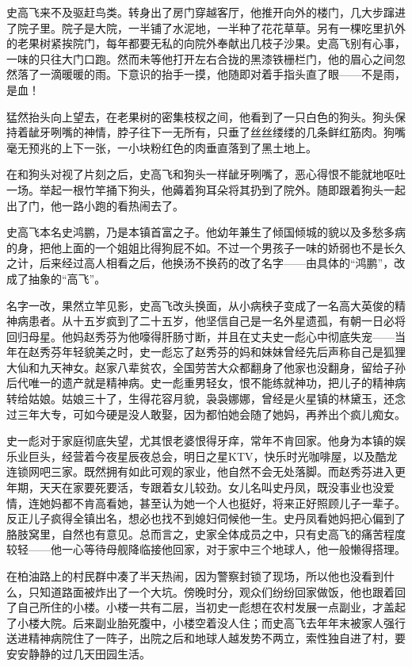 史高飞来不及驱赶鸟类。转身出了房门穿越客厅，他推开向外的楼门，几大步蹿进了院子里。院子是大院，一半铺了水泥地，一半种了花花草草。另有一棵吃里扒外的老果树紧挨院门，每年都要无私的向院外奉献出几枝子沙果。史高飞别有心事，一味的只往大门口跑。然而未等他打开左右合拢的黑漆铁栅栏门，他的眉心之间忽然落了一滴暖暖的雨。下意识的抬手一摸，他随即对着手指头直了眼——不是雨，是血！

猛然抬头向上望去，在老果树的密集枝杈之间，他看到了一只白色的狗头。狗头保持着龇牙咧嘴的神情，脖子往下一无所有，只垂了丝丝缕缕的几条鲜红筋肉。狗嘴毫无预兆的上下一张，一小块粉红色的肉垂直落到了黑土地上。

在和狗头对视了片刻之后，史高飞和狗头一样龇牙咧嘴了，恶心得恨不能就地呕吐一场。举起一根竹竿捅下狗头，他薅着狗耳朵将其扔到了院外。随即跟着狗头一起出了门，他一路小跑的看热闹去了。

史高飞本名史鸿鹏，乃是本镇首富之子。他幼年兼生了倾国倾城的貌以及多愁多病的身，把他上面的一个姐姐比得狗屁不如。不过一个男孩子一味的娇弱也不是长久之计，后来经过高人相看之后，他换汤不换药的改了名字——由具体的``鸿鹏''，改成了抽象的``高飞''。

名字一改，果然立竿见影，史高飞改头换面，从小病秧子变成了一名高大英俊的精神病患者。从十五岁疯到了二十五岁，他坚信自己是一名外星遗孤，有朝一日必将回归母星。他妈赵秀芬为他嚎得肝肠寸断，并且在丈夫史一彪心中彻底失宠——当年在赵秀芬年轻貌美之时，史一彪忘了赵秀芬的妈和妹妹曾经先后声称自己是狐狸大仙和九天神女。赵家八辈贫农，全国劳苦大众都翻身了他家也没翻身，留给子孙后代唯一的遗产就是精神病。史一彪重男轻女，恨不能练就神功，把儿子的精神病转给姑娘。姑娘三十了，生得花容月貌，袅袅娜娜，曾经是火星镇的林黛玉，还念过三年大专，可如今硬是没人敢娶，因为都怕她会随了她妈，再养出个疯儿痴女。

史一彪对于家庭彻底失望，尤其恨老婆恨得牙痒，常年不肯回家。他身为本镇的娱乐业巨头，经营着今夜星辰夜总会，明日之星KTV，快乐时光咖啡屋，以及酷龙连锁网吧三家。既然拥有如此可观的家业，他自然不会无处落脚。而赵秀芬进入更年期，天天在家要死要活，专跟着女儿较劲。女儿名叫史丹凤，既没事业也没爱情，连她妈都不肯高看她，甚至认为她一个人也挺好，将来正好照顾儿子一辈子。反正儿子疯得全镇出名，想必也找不到媳妇伺候他一生。史丹凤看她妈把心偏到了胳肢窝里，自然也有意见。总而言之，史家全体成员之中，只有史高飞的痛苦程度较轻——他一心等待母舰降临接他回家，对于家中三个地球人，他一般懒得搭理。

在柏油路上的村民群中凑了半天热闹，因为警察封锁了现场，所以他也没看到什么，只知道路面被炸出了一个大坑。傍晚时分，观众们纷纷回家做饭，他也跟着回了自己所住的小楼。小楼一共有二层，当初史一彪想在农村发展一点副业，才盖起了小楼大院。后来副业胎死腹中，小楼空着没人住；而史高飞去年年末被家人强行送进精神病院住了一阵子，出院之后和地球人越发势不两立，索性独自进了村，要安安静静的过几天田园生活。


